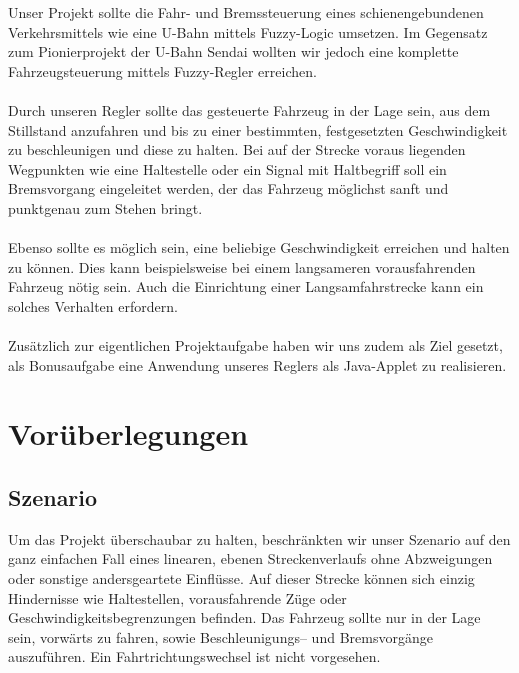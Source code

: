 \documentclass[10pt,a4paper]{article}
\begin{document}
Unser Projekt sollte die Fahr- und Bremssteuerung eines schienengebundenen Verkehrsmittels wie eine U-Bahn mittels Fuzzy-Logic umsetzen.
Im Gegensatz zum Pionierprojekt der U-Bahn Sendai wollten wir jedoch eine komplette Fahrzeugsteuerung mittels Fuzzy-Regler erreichen.
\paragraph{}
Durch unseren Regler sollte das gesteuerte Fahrzeug in der Lage sein, aus dem Stillstand anzufahren und bis zu einer bestimmten, festgesetzten Geschwindigkeit zu beschleunigen und diese zu halten. Bei auf der Strecke voraus liegenden Wegpunkten wie eine Haltestelle oder ein Signal mit Haltbegriff soll ein Bremsvorgang eingeleitet werden, der das Fahrzeug möglichst sanft und punktgenau zum Stehen bringt.
\paragraph{}
Ebenso sollte es möglich sein, eine beliebige Geschwindigkeit erreichen und halten zu können. Dies kann beispielsweise bei einem langsameren vorausfahrenden Fahrzeug nötig sein. Auch die Einrichtung einer Langsamfahrstrecke kann ein solches Verhalten erfordern.
\paragraph{}
Zusätzlich zur eigentlichen Projektaufgabe haben wir uns zudem als Ziel gesetzt, als Bonusaufgabe eine Anwendung unseres Reglers als Java-Applet zu realisieren.

\section{Vorüberlegungen}
\subsection{Szenario}

Um das Projekt überschaubar zu halten, beschränkten wir unser Szenario auf den ganz einfachen Fall eines linearen, ebenen Streckenverlaufs ohne Abzweigungen oder sonstige andersgeartete Einflüsse. Auf dieser Strecke können sich einzig Hindernisse wie Haltestellen, vorausfahrende Züge oder Geschwindigkeitsbegrenzungen befinden. Das Fahrzeug sollte nur in der Lage sein, vorwärts zu fahren, sowie Beschleunigungs-- und Bremsvorgänge auszuführen. Ein Fahrtrichtungswechsel ist nicht vorgesehen.
\end{document}
